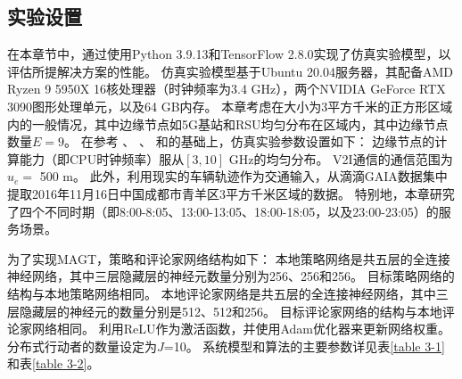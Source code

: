 \subsection{实验设置}

在本章节中，通过使用Python 3.9.13和TensorFlow 2.8.0实现了仿真实验模型，以评估所提解决方案的性能。
仿真实验模型基于Ubuntu 20.04服务器，其配备AMD Ryzen 9 5950X 16核处理器（时钟频率为3.4 GHz），两个NVIDIA GeForce RTX 3090图形处理单元，以及64 GB内存。
本章考虑在大小为3平方千米的正方形区域内的一般情况，其中边缘节点如5G基站和RSU均匀分布在区域内，其中边缘节点数量$E=9$。
在参考 、 、 和的基础上，仿真实验参数设置如下：
边缘节点的计算能力（即CPU时钟频率）服从$[3, 10]$ GHz的均匀分布\cite{zhou2019computation}。 
V2I通信的通信范围为$u_e =$ 500 m\cite{zhu2021decentralized}。
此外，利用现实的车辆轨迹作为交通输入，从滴滴GAIA数据集中提取2016年11月16日中国成都市青羊区3平方千米区域的数据。
特别地，本章研究了四个不同时期（即8:00-8:05、13:00-13:05、18:00-18:05，以及23:00-23:05）的服务场景。

为了实现MAGT，策略和评论家网络结构如下：
本地策略网络是共五层的全连接神经网络，其中三层隐藏层的神经元数量分别为256、256和256。
目标策略网络的结构与本地策略网络相同。
本地评论家网络是共五层的全连接神经网络，其中三层隐藏层的神经元的数量分别是512、512和256。
目标评论家网络的结构与本地评论家网络相同。
利用ReLU作为激活函数，并使用Adam优化器来更新网络权重。
分布式行动者的数量设定为$J$=10。
系统模型和算法的主要参数详见表\ref{table 3-1}和表\ref{table 3-2}。

\begin{table}[h]\small
{} %
\centering
{}
\label{table 3-1}
\end{table}

